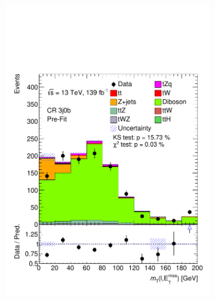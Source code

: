\begin{figure}[h!]
\begin{subfigure}[b]{0.33\linewidth}
    \includegraphics[width=\linewidth]{ubonn-thesis/Chapters/Chapters_05/Figure/CR_VV/CR_3j0b_mtW.pdf} 
  \end{subfigure} 
  \begin{subfigure}[b]{0.33\linewidth}
    \centering

\end{subfigure}
\end{figure}
